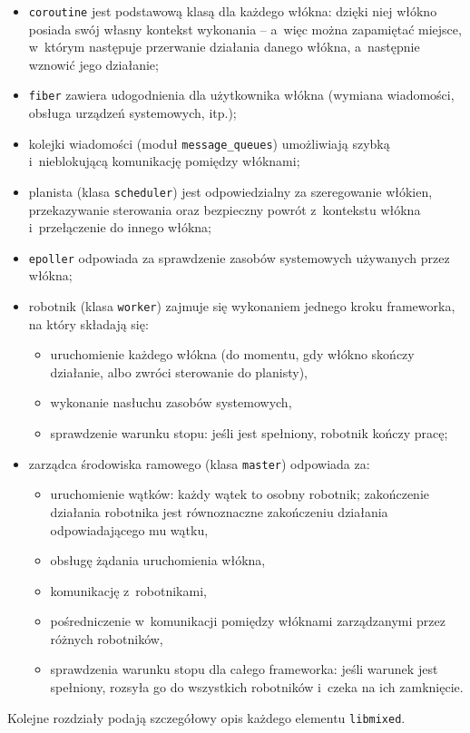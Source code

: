 \documentclass[12pt]{mwart}
\newcommand{\code}{\texttt}
\begin{document}
  \begin{itemize}
    \item \code{coroutine} jest podstawową klasą dla każdego włókna: dzięki niej włókno posiada swój własny kontekst wykonania -- a~więc można zapamiętać miejsce,
      w~którym następuje przerwanie działania danego włókna, a~następnie wznowić jego działanie;
    \item \code{fiber} zawiera udogodnienia dla użytkownika włókna (wymiana wiadomości, obsługa urządzeń systemowych, itp.);
    \item kolejki wiadomości (moduł \code{message\_queues}) umożliwiają szybką i~nieblokującą komunikację pomiędzy włóknami;
    \item planista (klasa \code{scheduler}) jest odpowiedzialny za szeregowanie włókien, przekazywanie sterowania oraz bezpieczny powrót z~kontekstu włókna i~przełączenie do innego włókna;
    \item \code{epoller} odpowiada za sprawdzenie zasobów systemowych używanych przez włókna;
    \item robotnik (klasa \code{worker}) zajmuje się wykonaniem jednego kroku framework\dywiz a, na który składają się:
      \begin{itemize}
        \item uruchomienie każdego włókna (do momentu, gdy włókno skończy działanie, albo zwróci sterowanie do planisty),
        \item wykonanie nasłuchu zasobów systemowych,
        \item sprawdzenie warunku stopu: jeśli jest spełniony, robotnik kończy pracę;
      \end{itemize}
    \item zarządca środowiska ramowego (klasa \code{master}) odpowiada za:
      \begin{itemize}
        \item uruchomienie wątków: każdy wątek to osobny robotnik; zakończenie działania robotnika jest równoznaczne zakończeniu działania odpowiadającego mu wątku,
        \item obsługę żądania uruchomienia włókna,
        \item komunikację z~robotnikami,
        \item pośredniczenie w~komunikacji pomiędzy włóknami zarządzanymi przez różnych robotników,
        \item sprawdzenia warunku stopu dla całego framework\dywiz a: jeśli warunek jest spełniony, rozsyła go do wszystkich robotników i~czeka na ich zamknięcie.
      \end{itemize}
  \end{itemize}
\par
%
\indent
  Kolejne rozdziały podają szczegółowy opis każdego elementu \code{libmixed}.
\par
\newpage
\end{document}
